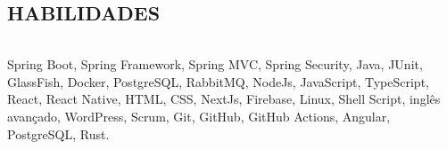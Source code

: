 \begin{framed}
    \section{HABILIDADES}
    \begin{tabular}{r|p{5cm}}
    \end{tabular}
    Spring Boot, Spring Framework, Spring MVC, Spring Security, Java, JUnit, GlassFish, Docker, PostgreSQL, RabbitMQ, NodeJs, JavaScript, TypeScript, React, React Native, HTML, CSS,   NextJs, Firebase, Linux, Shell Script, inglês avançado, WordPress, Scrum, Git, GitHub, GitHub Actions, Angular, PostgreSQL, Rust. 
  \end{framed}
